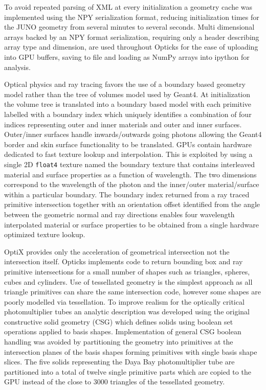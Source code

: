\documentclass[a4paper]{jpconf}
\begin{document}
To avoid repeated parsing of XML at every initialization
a geometry cache was implemented using the NPY\cite{NPY} serialization format, reducing 
initialization times for the JUNO geometry from several minutes to several seconds.
Multi dimensional arrays backed by an NPY format serialization, requiring only a header describing array type and dimension,
are used throughout Opticks for the ease of uploading into GPU buffers, saving to file and 
loading as NumPy\cite{numpy} arrays into ipython\cite{ipython} for analysis.

Optical physics and ray tracing favors the use of a boundary based geometry model 
rather than the tree of volumes model used by Geant4. 
At initialization the volume tree is translated into a boundary based model 
with each primitive labelled with a boundary index which uniquely identifies 
a combination of four indices representing outer and inner materials and outer and inner surfaces.
Outer/inner surfaces handle inwards/outwards going photons allowing the Geant4 border and skin 
surface functionality to be translated.
GPUs contain hardware dedicated to fast texture lookup and interpolation. 
This is exploited by using a single 2D {\tt float4} texture named the boundary texture 
that contains interleaved material and surface properties as a function of wavelength. 
The two dimensions correspond to the wavelength of the photon and the inner/outer material/surface 
within a particular boundary. 
The boundary index returned from a ray traced primitive intersection together with 
an orientation offset identified from the angle between the geometric normal and ray directions 
enables four wavelength interpolated material or surface properties to be 
obtained from a single hardware optimized texture lookup.

OptiX provides only the acceleration of geometrical intersection not the intersection itself.
Opticks implements code to return bounding box and ray primitive intersections for a small
number of shapes such as triangles, spheres, cubes and cylinders.  
Use of tessellated geometry is the simplest approach as all triangle primitives can
share the same intersection code, however some shapes are poorly modelled via tessellation.
To improve realism for the optically critical photomultiplier tubes an analytic description was developed 
using the original constructive solid geometry (CSG) which defines solids using boolean set operations applied to basis shapes.
Implementation of general CSG boolean handling was avoided by partitioning the geometry into primitives 
at the intersection planes of the basis shapes forming primitives with single basis shape slices.
%
The five solids representing the Daya Bay photomultiplier tube are partitioned into a total of twelve single primitive parts 
which are copied to the GPU instead of the close to 3000 triangles of the tessellated geometry. 
\end{document}
